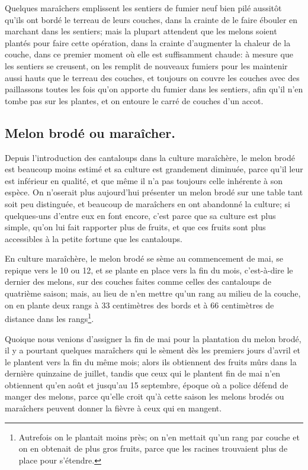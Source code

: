 \documentclass[10pt,a4paper]{book}
\begin{document}
Quelques maraîchers emplissent les sentiers de fumier neuf bien pilé aussitôt qu'ils ont bordé le terreau de leurs couches, dans la crainte de le faire ébouler en marchant dans les sentiers; mais la plupart attendent que les melons soient plantés pour faire cette opération, dans la crainte d'augmenter la chaleur de la couche, dans ce premier moment où elle est suffisamment chaude: à mesure que les sentiers se creusent, on les remplit de nouveaux fumiers pour les maintenir aussi hauts que le terreau des couches, et toujours on couvre les couches avec des paillassons toutes les fois qu'on apporte du fumier dans les sentiers, afin qu'il n'en tombe pas sur les plantes, et on entoure le carré de couches d'un accot.

\subsection{Melon brodé ou maraîcher.}

Depuis l'introduction des cantaloups dans la culture maraîchère, le melon brodé est beaucoup moins estimé et sa culture est grandement diminuée, parce qu'il leur est inférieur en qualité, et que même il n'a pas toujours celle inhérente à son espèce. On n'oserait plus aujourd'hui présenter un melon brodé sur une table tant soit peu distinguée, et beaucoup de maraîchers en ont abandonné la culture; si quelques-uns d'entre eux en font encore, c'est parce que sa culture est plus simple, qu'on lui fait rapporter plus de fruits, et que ces fruits sont plus accessibles à la petite fortune que les cantaloups.

En culture maraîchère, le melon brodé se sème au commencement de mai, se repique vers le 10 ou 12, et se plante en place vers la fin du mois, c'est-à-dire le dernier des melons, sur des couches faites comme celles des cantaloups de quatrième saison; mais, au lieu de n'en mettre qu'un rang au milieu de la couche, on en plante deux rangs à 33 centimètres des bords et à 66 centimètres de distance dans les rangs\footnote{Autrefois on le plantait moins près; on n'en mettait qu'un rang par couche et on en obtenait de plus gros fruits, parce que les racines trouvaient plus de place pour s'étendre.}.

Quoique nous venions d'assigner la fin de mai pour la plantation du melon brodé, il y a pourtant quelques maraîchers qui le sèment dès les premiers jours d'avril et le plantent vers la fin du même mois; alors ils obtiennent des fruits mûrs dans la dernière quinzaine de juillet, tandis que ceux qui le plantent fin de mai n'en obtiennent qu'en août et jusqu'au 15 septembre, époque où a police défend de manger des melons, parce qu'elle croit qu'à cette saison les melons brodés ou maraîchers peuvent donner la fièvre à ceux qui en mangent.
\end{document}
